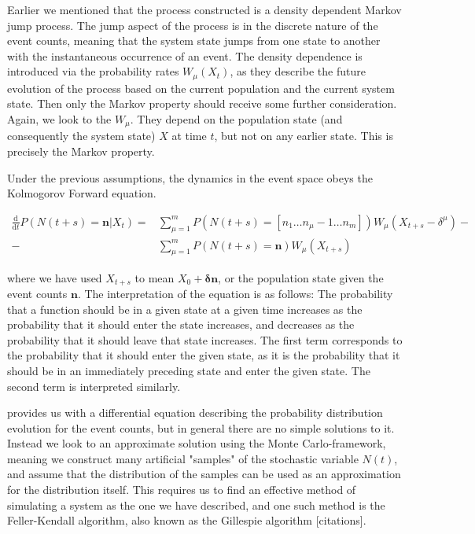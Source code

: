 \documentclass[10pt,a4paper]{article}
\begin{document}

Earlier we mentioned that the process constructed is a density dependent Markov jump process. The jump aspect of the process is in the discrete nature of the event counts, meaning that the system state jumps from one state to another with the instantaneous occurrence of an event. The density dependence is introduced via the probability rates $W_\mu \left( X_t\right)$, as they describe the future evolution of the process based on the current population and the current system state. Then only the Markov property should receive some further consideration. Again, we look to the $W_\mu$. They depend on the population state (and consequently the system state) $X$ at time $t$, but not on any earlier state. This is precisely the Markov property.


\begin{theorem}
	Under the previous assumptions, the dynamics in the event space obeys the Kolmogorov Forward equation.
	
	\begin{align}
		\frac{\textrm{d}}{\textrm{d}t} P \left( N \left( t + s \right) = \bm{n} | X_t \right) =
		&  \sum_{\mu = 1}^m P \left( N \left( t + s \right) = \left[ n_1 \ldots n_\mu - 1 \ldots n_m \right] \right) W_{\mu} \left( X_ {t+s} - \delta^{\mu} \right) - \\
		- & \sum_{\mu = 1}^m P \left( N \left( t + s \right) = \bm{n} \right) W_{\mu} \left( X_{t+s} \right) \label{eq:kolmogorov_forward}
	\end{align} \label{th:kolmogorov_forward}
\end{theorem}

where we have used $X_{t+s}$ to mean $X_0 + \bm{\delta}\bm{n}$, or the population state given the event counts $\bm{n}$. The interpretation of the equation is as follows: The probability that a function should be in a given state at a given time increases as the probability that it should enter the state increases, and decreases as the probability that it should leave that state increases. The first term corresponds to the probability that it should enter the given state, as it is the probability that it should be in an immediately preceding state and enter the given state. The second term is interpreted similarly.

 provides us with a differential equation describing the probability distribution evolution for the event counts, but in general there are no simple solutions to it. Instead we look to an approximate solution using the Monte Carlo-framework, meaning we construct many artificial "samples" of the stochastic variable $N \left( t \right)$, and assume that the distribution of the samples can be used as an approximation for the distribution itself. This requires us to find an effective method of simulating a system as the one we have described, and one such method is the Feller-Kendall algorithm, also known as the Gillespie algorithm [citations].
\end{document}
